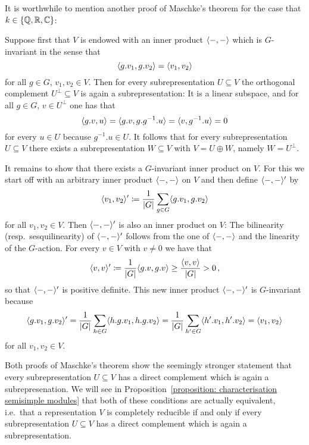 \begin{fluff}
  \label{fluff: orthogonality proof of Maschke}
  It is worthwhile to mention another proof of Maschke’s theorem for the case that $k \in \{\mathbb{Q}, \mathbb{R}, \mathbb{C}\}$:
  
  Suppose first that $V$ is endowed with an inner product $\langle -,- \rangle$ which is $G$-invariant in the sense that
  \[
      \langle g.v_1, g.v_2 \rangle
    = \langle v_1, v_2 \rangle
  \]
  for all $g \in G$, $v_1, v_2 \in V$.
  Then for every subrepresentation $U \subseteq V$ the orthogonal complement $U^\perp \subseteq V$ is again a subrepresentation:
  It is a linear subspace, and for all $g \in G$, $v \in U^\perp$ one has that
  \[
      \langle g.v, u \rangle
    = \langle g.v, g.g^{-1}.u \rangle
    = \langle v, g^{-1}.u \rangle
    = 0
  \]
  for every $u \in U$ because $g^{-1}.u \in U$.
  It follows that for every subrepresentation $U \subseteq V$ there exists a subrepresentation $W \subseteq V$ with $V = U \oplus W$, namely $W = U^\perp$.
  
  It remains to show that there exists a $G$-invariant inner product on $V$.
  For this we start off with an arbitrary inner product $\langle -,- \rangle$ on $V$ and then define $\langle -,- \rangle'$ by
  \[
              \langle v_1, v_2 \rangle'
    \coloneqq  \frac{1}{|G|} \sum_{g \in G} \langle g.v_1, g.v_2 \rangle
  \]
  for all $v_1, v_2 \in V$.
  Then $\langle -,- \rangle'$ is also an inner product on $V$:
  The bilinearity (resp.\ sesquilinearity) of $\langle -,- \rangle'$ follows from the one of $\langle -,- \rangle$ and the linearity of the $G$-action.
  For every $v \in V$ with $v \neq 0$ we have that
  \[
              \langle v,v \rangle'
    \coloneqq  \frac{1}{|G|} \langle g.v, g.v \rangle
    \geq      \frac{\langle v, v \rangle}{|G|}
    >         0 \,,
  \]
  so that $\langle -,- \rangle'$ is positive definite.
  This new inner product $\langle -,- \rangle'$ is $G$-invariant because
  \[
      \langle g.v_1, g.v_2 \rangle'
    = \frac{1}{|G|} \sum_{h \in G} \langle h.g.v_1, h.g.v_2 \rangle
    = \frac{1}{|G|} \sum_{h' \in G} \langle h'.v_1, h'.v_2 \rangle
    = \langle v_1, v_2 \rangle
  \]
  for all $v_1, v_2 \in V$.
\end{fluff}


\begin{remark}
  Both proofs of Maschke’s theorem show the seemingly stronger statement that every subrepresentation $U \subseteq V$ has a direct complement which is again a subrepresenation.
  We will see in Proposition~\ref{proposition: characterisation semisimple modules} that both of these conditions are actually equivalent, i.e.\ that a representation $V$ is completely reducible if and only if every subrepresentation $U \subseteq V$ has a direct complement which is again a subrepresentation.
\end{remark}


